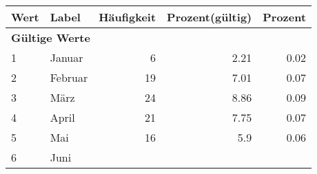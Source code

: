      \begin{longtable}{lXrrr}
     \toprule
     \textbf{Wert} & \textbf{Label} & \textbf{Häufigkeit} & \textbf{Prozent(gültig)} & \textbf{Prozent} \\
     \endhead
     \midrule
     \multicolumn{5}{l}{\textbf{Gültige Werte}}\\

     1 &
     \multicolumn{1}{X}{ Januar   } &


       \num{6} &
       \num[round-mode=places,round-precision=2]{2.21} &
         \num[round-mode=places,round-precision=2]{0.02} \\

     2 &
     \multicolumn{1}{X}{ Februar   } &


       \num{19} &
       \num[round-mode=places,round-precision=2]{7.01} &
         \num[round-mode=places,round-precision=2]{0.07} \\

     3 &
     \multicolumn{1}{X}{ März   } &


       \num{24} &
       \num[round-mode=places,round-precision=2]{8.86} &
         \num[round-mode=places,round-precision=2]{0.09} \\

     4 &
     \multicolumn{1}{X}{ April   } &


       \num{21} &
       \num[round-mode=places,round-precision=2]{7.75} &
         \num[round-mode=places,round-precision=2]{0.07} \\

     5 &
     \multicolumn{1}{X}{ Mai   } &


       \num{16} &
       \num[round-mode=places,round-precision=2]{5.9} &
         \num[round-mode=places,round-precision=2]{0.06} \\

     6 &
     \multicolumn{1}{X}{ Juni   } &



\end{longtable}
